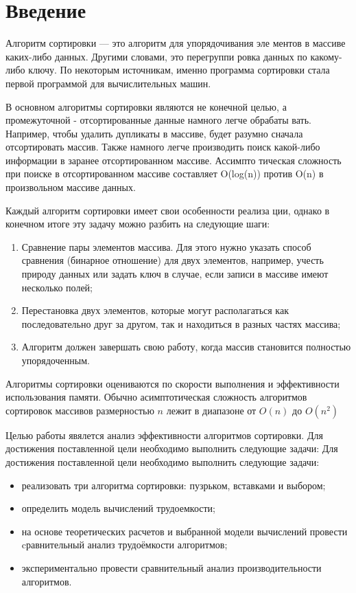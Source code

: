 \chapter*{Введение}

Алгоритм сортировки — это алгоритм для упорядочивания эле­
ментов в массиве каких-либо данных. Другими словами, это перегруппи­
ровка данных по какому-либо ключу. По некоторым источникам, именно
программа сортировки стала первой программой для вычислительных
машин.

В основном алгоритмы сортировки являются не конечной целью,
а промежуточной - отсортированные данные намного легче обрабаты­
вать. Например, чтобы удалить дупликаты в массиве, будет разумно
сначала отсортировать массив. Также намного легче производить поиск
какой-либо информации в заранее отсортированном массиве. Ассимпто­
тическая сложность при поиске в отсортированном массиве составляет
O(log(n)) против O(n) в произвольном массиве данных.

Каждый алгоритм сортировки имеет свои особенности реализа­
ции, однако в конечном итоге эту задачу можно разбить на следующие
шаги:
\begin{enumerate}
	\item Сравнение пары элементов массива. Для этого нужно указать	способ сравнения (бинарное отношение)
	 для двух элементов, например,	учесть природу данных или задать ключ в случае, если записи в массиве
	  имеют несколько полей;
	\item Перестановка двух элементов, которые могут располагаться как последовательно друг за другом, 
	так и находиться в разных частях мас­сива;
	\item Алгоритм должен завершать свою работу, когда массив становит­ся полностью упорядоченным.
\end{enumerate}


Алгоритмы сортировки оцениваются по скорости выполнения и эффективности использования памяти.
Обычно асимптотическая сложность алгоритмов сортировок массивов размерностью $n$ лежит в 
диапазоне от $O(n)$ до $O(n^2)$


Целью работы явялется анализ эффективности алгоритмов сортировки. Для достижения поставленной цели необходимо
выполнить следующие задачи:
Для достижения поставленной цели необходимо выполнить следующие задачи:
\begin{itemize}
	\item реализовать три алгоритма сортировки: пузрьком, вставками и выбором;
	\item определить модель вычислений трудоемкости;
	\item на основе теоретических расчетов и выбранной модели вычислений провести cравнительный анализ трудоёмкости алгоритмов;
	\item экспериментально провести сравнительный анализ производительности алгоритмов.
\end{itemize}




